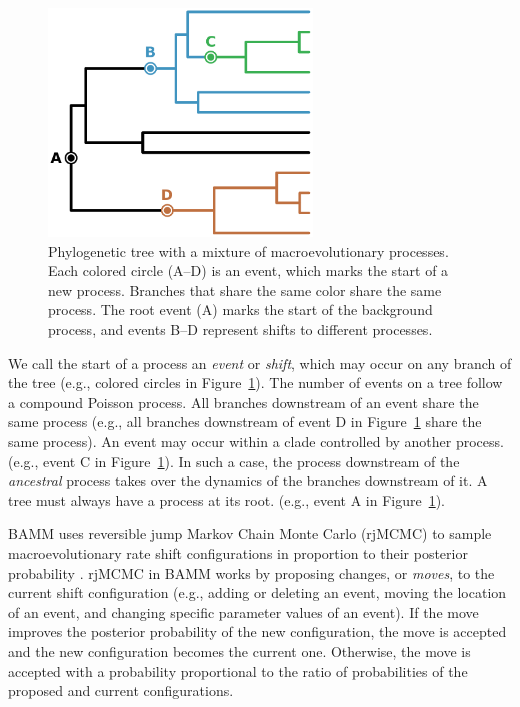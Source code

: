 \documentclass[12pt]{article}
\begin{document}
\begin{figure}
\begin{center}
\includegraphics[width=7cm]{tree.pdf}
\end{center}
\caption{Phylogenetic tree with a mixture of macroevolutionary processes.
    Each colored circle (A--D) is an event,
    which marks the start of a new process.
    Branches that share the same color share the same process.
    The root event (A) marks the start of the background process,
    and events B--D represent shifts to different processes.}
\label{fig:tree}
\end{figure}


We call the start of a process an \emph{event} or \emph{shift},
which may occur on any branch of the tree
(e.g., colored circles in Figure~\ref{fig:tree}).
%
The number of events on a tree follow a compound Poisson process.
%
All branches downstream of an event share the same process
(e.g., all branches downstream of event D
in Figure~\ref{fig:tree} share the same process).
%
An event may occur within a clade controlled by another process.
(e.g., event C in Figure~\ref{fig:tree}).
%
In such a case, the process downstream of the \emph{ancestral} process
takes over the dynamics of the branches downstream of it.
%
A tree must always have a process at its root.
(e.g., event A in Figure~\ref{fig:tree}).


BAMM uses reversible jump Markov Chain Monte Carlo (rjMCMC)
to sample macroevolutionary rate shift configurations in proportion to their 
posterior probability \citep{rab14plos}.
%
rjMCMC in BAMM works by proposing changes, or \emph{moves},
to the current shift configuration
(e.g., adding or deleting an event,
moving the location of an event,
and changing specific parameter values of an event).
%
If the move improves the posterior probability of the new configuration,
the move is accepted and the new configuration becomes the current one.
%
Otherwise, the move is accepted with a probability proportional
to the ratio of probabilities of the proposed and current configurations.
\end{document}
